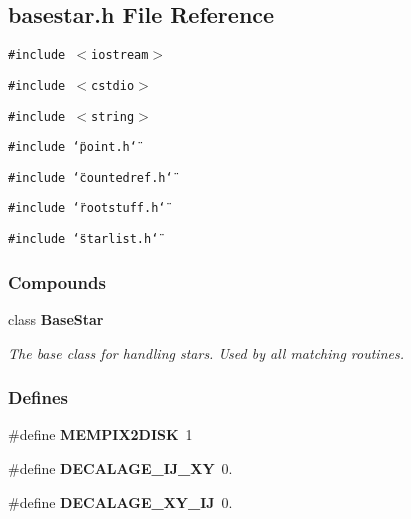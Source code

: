 \subsection{basestar.h File Reference}
\label{basestar_h}
{\tt \#include $<$iostream$>$}\par
{\tt \#include $<$cstdio$>$}\par
{\tt \#include $<$string$>$}\par
{\tt \#include \char`\"{}point.h\char`\"{}}\par
{\tt \#include \char`\"{}countedref.h\char`\"{}}\par
{\tt \#include \char`\"{}rootstuff.h\char`\"{}}\par
{\tt \#include \char`\"{}starlist.h\char`\"{}}\par
\subsubsection*{Compounds}
\begin{CompactItemize}
\item 
class {\bf Base\-Star}
\begin{CompactList}\small\item\em The base class for handling stars. Used by all matching routines.\item\end{CompactList}\end{CompactItemize}
\subsubsection*{Defines}
\begin{CompactItemize}
\item 
{}
\#define {\bf MEMPIX2DISK}\ 1\label{basestar_h_a0}

\item 
{}
\#define {\bf DECALAGE\_\-IJ\_\-XY}\ 0.\label{basestar_h_a1}

\item 
{}
\#define {\bf DECALAGE\_\-XY\_\-IJ}\ 0.\label{basestar_h_a2}

\end{CompactItemize}
